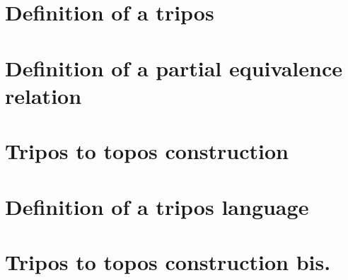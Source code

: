 \section{Definition of a tripos}

\section{Definition of a partial equivalence relation}

\section{Tripos to topos construction}

\section{Definition of a tripos language}

\section{Tripos to topos construction bis.}


